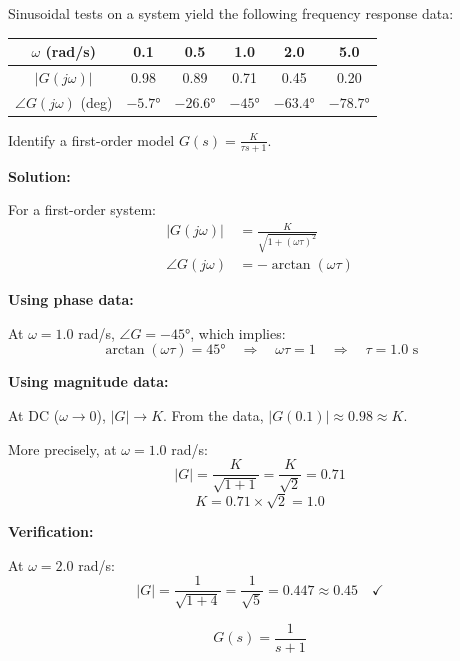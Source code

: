 \begin{example}
\label{ex:freq_id}
Sinusoidal tests on a system yield the following frequency response data:

\begin{center}
\begin{tabular}{cccccc}
\toprule
$\omega$ (rad/s) & 0.1 & 0.5 & 1.0 & 2.0 & 5.0 \\
\midrule
$|G(j\omega)|$ & 0.98 & 0.89 & 0.71 & 0.45 & 0.20 \\
$\angle G(j\omega)$ (deg) & $-5.7°$ & $-26.6°$ & $-45°$ & $-63.4°$ & $-78.7°$ \\
\bottomrule
\end{tabular}
\end{center}

Identify a first-order model $G(s) = \frac{K}{\tau s + 1}$.

\textbf{Solution:}

For a first-order system:
\begin{align*}
|G(j\omega)| &= \frac{K}{\sqrt{1 + (\omega\tau)^2}} \\
\angle G(j\omega) &= -\arctan(\omega\tau)
\end{align*}

\textbf{Using phase data:}

At $\omega = 1.0$ rad/s, $\angle G = -45°$, which implies:
\begin{equation*}
\arctan(\omega\tau) = 45° \quad \Rightarrow \quad \omega\tau = 1 \quad \Rightarrow \quad \tau = 1.0 \text{ s}
\end{equation*}

\textbf{Using magnitude data:}

At DC ($\omega \to 0$), $|G| \to K$. From the data, $|G(0.1)| \approx 0.98 \approx K$.

More precisely, at $\omega = 1.0$ rad/s:
\begin{equation*}
|G| = \frac{K}{\sqrt{1 + 1}} = \frac{K}{\sqrt{2}} = 0.71
\end{equation*}
\begin{equation*}
K = 0.71 \times \sqrt{2} = 1.0
\end{equation*}

\textbf{Verification:}

At $\omega = 2.0$ rad/s:
\begin{equation*}
|G| = \frac{1}{\sqrt{1 + 4}} = \frac{1}{\sqrt{5}} = 0.447 \approx 0.45 \quad \checkmark
\end{equation*}

\begin{equation*}
\boxed{G(s) = \frac{1}{s + 1}}
\end{equation*}
\end{example}

